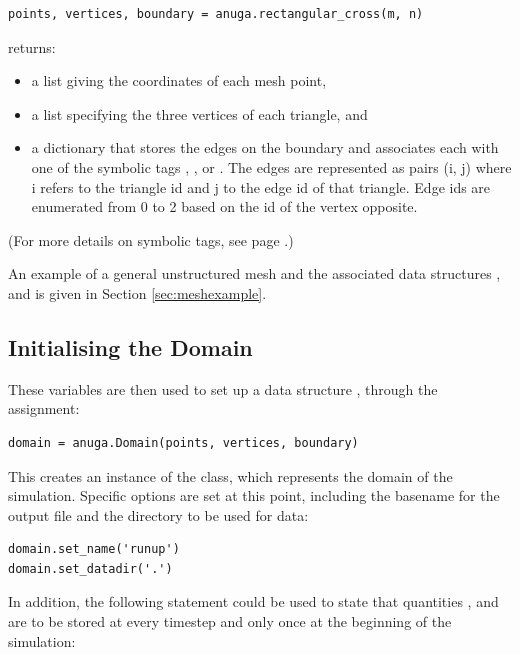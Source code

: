 \documentclass{manual}
\begin{document}
\begin{verbatim}
points, vertices, boundary = anuga.rectangular_cross(m, n)
\end{verbatim}

returns:

\begin{itemize}
   \item a list  giving the coordinates of each mesh point,
   \item a list  specifying the three vertices of each triangle, and
   \item a dictionary  that stores the edges on
         the boundary and associates each with one of the symbolic tags , ,
          or . The edges are represented as pairs (i, j) where i refers to the triangle id and j to the edge id of that triangle. 
         Edge ids are enumerated from 0 to 2 based on the id of the vertex opposite. 
\end{itemize}

(For more details on symbolic tags, see page
\pageref{ref:tagdescription}.)

An example of a general unstructured mesh and the associated data
structures ,  and  is
given in Section \ref{sec:meshexample}.

\subsection{Initialising the Domain}

These variables are then used to set up a data structure
, through the assignment:

\begin{verbatim}
domain = anuga.Domain(points, vertices, boundary)
\end{verbatim}

This creates an instance of the  class, which
represents the domain of the simulation. Specific options are set at
this point, including the basename for the output file and the
directory to be used for data:

\begin{verbatim}
domain.set_name('runup')
domain.set_datadir('.')
\end{verbatim}

In addition, the following statement could be used to state that
quantities ,  and  are
to be stored at every timestep and  only once at 
the beginning of the simulation:
\end{document}
